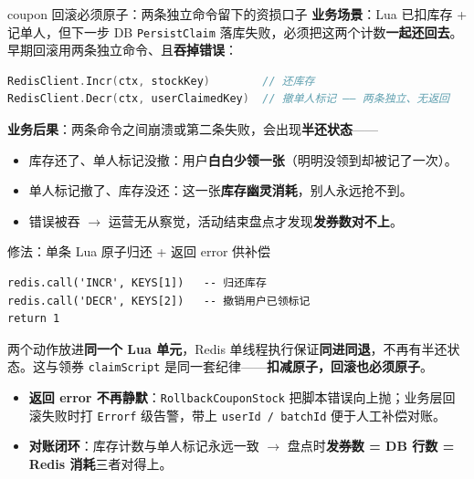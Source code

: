 \documentclass[aspectratio=169,11pt]{beamer}
\begin{document}
\begin{frame}{coupon 回滚必须原子：两条独立命令留下的资损口子}
\small \textbf{业务场景}：Lua 已扣库存 + 记单人，但下一步 DB \texttt{PersistClaim} 落库失败，必须把这两个计数\textbf{一起还回去}。早期回滚用两条独立命令、且\textbf{吞掉错误}：
\begin{lstlisting}[language=Go,firstnumber=1,
  caption={旧实现：库存与已领标记分两次写、错误被丢弃}]
RedisClient.Incr(ctx, stockKey)        // 还库存
RedisClient.Decr(ctx, userClaimedKey)  // 撤单人标记 —— 两条独立、无返回
\end{lstlisting}
\vspace{-1mm}
\textbf{业务后果}：两条命令之间崩溃或第二条失败，会出现\textbf{半还状态}——
\begin{itemize}\itemsep0pt
  \item 库存还了、单人标记没撤：用户\textbf{白白少领一张}（明明没领到却被记了一次）。
  \item 单人标记撤了、库存没还：这一张\textbf{库存幽灵消耗}，别人永远抢不到。
  \item 错误被吞 $\to$ 运营无从察觉，活动结束盘点才发现\textbf{发券数对不上}。
\end{itemize}
\end{frame}

\begin{frame}{修法：单条 Lua 原子归还 + 返回 error 供补偿}
\begin{lstlisting}[language=LuaRedis,firstnumber=50,
  caption={}]
redis.call('INCR', KEYS[1])   -- 归还库存
redis.call('DECR', KEYS[2])   -- 撤销用户已领标记
return 1
\end{lstlisting}
\vspace{-1mm}
\small 两个动作放进\textbf{同一个 Lua 单元}，Redis 单线程执行保证\textbf{同进同退}，不再有半还状态。这与领券 \texttt{claimScript} 是同一套纪律——\textbf{扣减原子，回滚也必须原子}。
\vspace{1mm}
\begin{itemize}\itemsep0pt
  \item \textbf{返回 error 不再静默}：\texttt{RollbackCouponStock} 把脚本错误向上抛；业务层回滚失败时打 \texttt{Errorf} 级告警，带上 \texttt{userId / batchId} 便于人工补偿对账。
  \item \textbf{对账闭环}：库存计数与单人标记永远一致 $\to$ 盘点时\textbf{发券数 = DB 行数 = Redis 消耗}三者对得上。
\end{itemize}
\end{frame}
\end{document}
